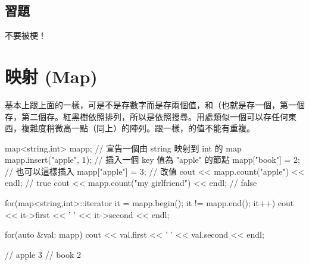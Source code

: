 \documentclass[main.tex]{subfiles}
\begin{document}
\subsection{習題}
不要被梗！
\section{映射 (Map)}
基本上跟上面的一樣，可是不是存數字而是存兩個值，和（也就是存一個，第一個存，第二個存。紅黑樹依照排列，所以是依照搜尋。用處類似一個可以存任何東西，複雜度稍微高一點（同上）的陣列。跟一樣，的值不能有重複。
\begin{C++}
map<string,int> mapp;
// 宣告一個由 string 映射到 int 的 map
mapp.insert({"apple", 1});
// 插入一個 key 值為 "apple" 的節點
mapp["book"] = 2; // 也可以這樣插入
mapp["apple"] = 3; // 改值
cout << mapp.count("apple") << endl; // true
cout << mapp.count("my girlfriend") << endl; // false

for(map<string,int>::iterator it = mapp.begin(); it != mapp.end(); it++)
    cout << it->first << ' ' << it->second << endl;

for(auto &val: mapp)
    cout << val.first << ' ' << val.second << endl;

// apple 3
// book 2
\end{C++}
\end{document}

